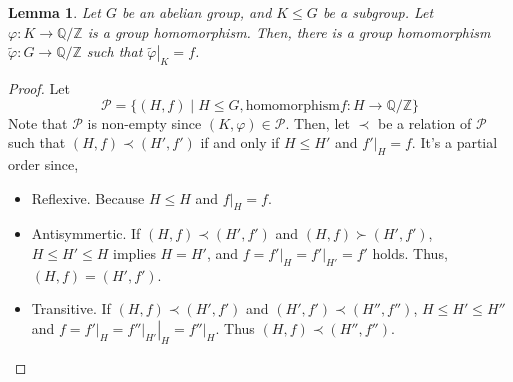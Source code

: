 \documentclass{article}
\newtheorem{lemma}{Lemma}
\newcommand{\bbQ}{\mathbb{Q}}
\newcommand{\bbZ}{\mathbb{Z}}
\newcommand{\calP}{\mathcal{P}}
\begin{document}
\begin{lemma}\label{lem-char}
  Let \(G\) be an abelian group, and \(K \le G\) be a subgroup.
  Let \(\varphi: K \to \bbQ / \bbZ\) is a group homomorphism.
  Then, there is a group homomorphism \(\tilde{\varphi}: G \to \bbQ / \bbZ\)
  such that \(\left. \tilde{\varphi} \right|_K = f\).
\end{lemma}
\begin{proof}

Let
\[\calP = \{(H, f) \mid H \le G, \text{homomorphism} f: H \to \bbQ/ \bbZ\}\]
Note that \(\calP\) is non-empty since \((K, \varphi) \in \calP\).
Then, let \(\prec\) be a relation of \(\calP\) such that
\((H, f) \prec (H', f')\) if and only if \(H \le H'\) and \(\left. f' \right|_H = f\).
It's a partial order since,
\begin{itemize}
\item Reflexive. Because \(H \le H\) and \(\left. f \right|_H = f\).
\item Antisymmertic. If \((H, f) \prec (H', f')\) and \((H, f) \succ (H', f')\),
\(H \le H' \le H\) implies \(H = H'\), and \(f = \left. f' \right|_H = \left. f' \right|_{H'} = f'\) holds. Thus, \((H, f) = (H', f')\).
\item Transitive. If \((H, f) \prec (H', f')\) and \((H', f') \prec (H'', f'')\), \(H \le H' \le H''\) and \(f = \left. f' \right|_H = \left. \left. f'' \right|_{H'} \right|_{H} = \left. f'' \right|_{H}\). Thus \((H, f) \prec (H'', f'')\).
\end{itemize}


\end{proof}
\end{document}
